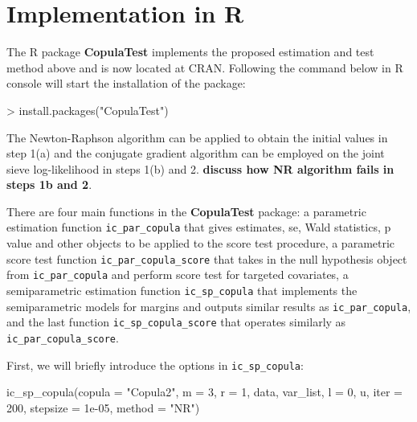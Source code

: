 \section{Implementation in R}
The R package \textbf{CopulaTest} implements the proposed estimation and test method above and is now located at CRAN. Following the command below in R console will start the installation of the package:

\begin{example}
  > install.packages("CopulaTest")
\end{example}

The Newton-Raphson algorithm can be applied to obtain the initial values in step 1(a) and the conjugate gradient algorithm can be employed on the joint sieve log-likelihood in steps 1(b) and 2. \textbf{discuss how NR algorithm fails in steps 1b and 2}.

There are four main functions in the \textbf{CopulaTest} package: a parametric estimation function \texttt{ic\_par\_copula} that gives estimates, se, Wald statistics, p value and other objects to be applied to the score test procedure, a parametric score test function \texttt{ic\_par\_copula\_score} that takes in the null hypothesis object from \texttt{ic\_par\_copula} and perform score test for targeted covariates, a semiparametric estimation function \texttt{ic\_sp\_copula} that implements the semiparametric models for margins and outputs similar results as \texttt{ic\_par\_copula}, and the last function \texttt{ic\_sp\_copula\_score} that operates similarly as \texttt{ic\_par\_copula\_score}.

First, we will briefly introduce the options in \texttt{ic\_sp\_copula}:

\begin{example}
  ic_sp_copula(copula = "Copula2", m = 3, r = 1, data, var_list, l = 0, u, iter = 200, 
               stepsize = 1e-05, method = "NR")
\end{example}


